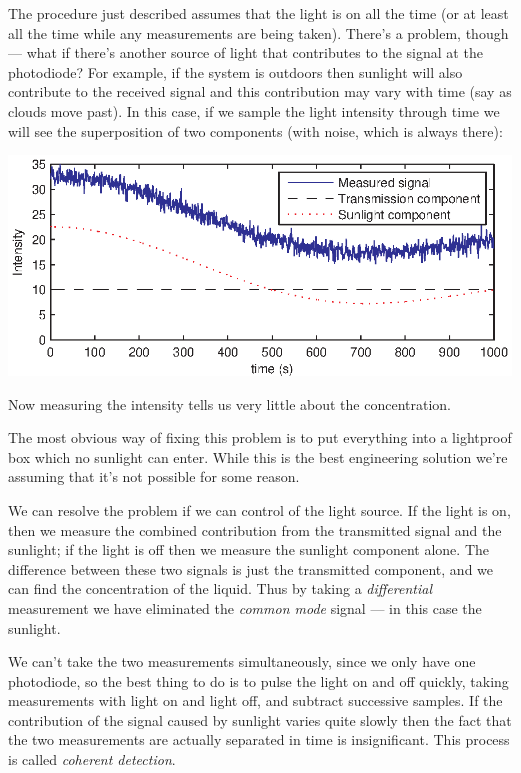 \documentclass[10pt]{beamer}
\begin{document}
The procedure just described assumes that the light is on all the time (or at least all the time while any measurements are being taken).  There's a problem, though --- what if there's another source of light that contributes to the signal at the photodiode?  For example, if the system is outdoors then sunlight will also contribute to the received signal and this contribution may vary with time (say as clouds move past).  In this case, if we sample the light intensity through time we will see the superposition of two components (with noise, which is always there):
\begin{center}
  \includegraphics{me_example1}
\end{center}
Now measuring the intensity tells us very little about the concentration.

The most obvious way of fixing this problem is to put everything into a lightproof box which no sunlight can enter.  While this is the best engineering solution we're assuming that it's not possible for some reason.

We can resolve the problem if we can control of the light source.  If the light is on, then we measure the combined contribution from the transmitted signal and the sunlight;  if the light is off then we measure the sunlight component alone.  The difference between these two signals is just the transmitted component, and we can find the concentration of the liquid.  Thus by taking a {\em differential} measurement we have eliminated the {\em common mode} signal --- in this case the sunlight.

We can't take the two measurements simultaneously, since we only have one photodiode, so the best thing to do is to pulse the light on and off quickly, taking measurements with light on and light off, and subtract successive samples.  If the contribution of the signal caused by sunlight varies quite slowly then the fact that the two measurements are actually separated in time is insignificant.  This process is called {\em coherent detection}.
\end{document}
